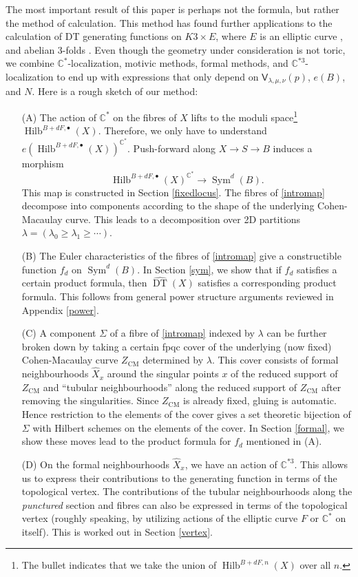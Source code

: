\documentclass{amsart}
\theoremstyle{definition}
\newcommand{\CC} {\mathbb{C}}          %
\newcommand{\sfV}{\mathsf{V}}
\newcommand{\Sym}{\operatorname{Sym}}
\newcommand{\Hilb}{\operatorname{Hilb}}
\newcommand{\DT}{\operatorname{DT}}
\newcommand{\CM}{\operatorname{CM}}
\begin{document}
The most important result of this paper is perhaps not the formula, but rather the method of calculation. This method has found further applications to the calculation of DT generating functions on $K3 \times E$, where $E$ is an elliptic curve \cite{Bry}, and abelian 3-folds \cite{BOPY}. Even though the geometry under consideration is not toric, we combine $\CC^*$-localization, motivic methods, formal methods, and $\CC^{*3}$-localization to end up with expressions that only depend on $\sfV_{\lambda,\mu,\nu}(p)$, $e(B)$, and $N$. Here is a rough sketch of our method:
\begin{enumerate}
\item[(A)] The action of $\CC^*$ on the fibres of $X$ lifts to the moduli space\footnote{The bullet indicates that we take the union of $\Hilb^{B+dF,n}(X)$ over all $n$.} $\Hilb^{B+dF,\bullet}(X)$. Therefore, we only have to understand $e(\Hilb^{B+dF,\bullet}(X))^{\CC^*}$. Push-forward along $X \rightarrow S \rightarrow B$ induces a morphism
\begin{equation} \label{intromap}
\Hilb^{B+dF,\bullet}(X)^{\CC^*} \rightarrow \Sym^d(B).
\end{equation}
This map is constructed in Section \ref{fixedlocus}. The fibres of \eqref{intromap} decompose into components according to the shape of the underlying Cohen-Macaulay curve. This leads to a decomposition over 2D partitions $\lambda = (\lambda_0 \geq \lambda_1 \geq \cdots)$.
\item[(B)] The Euler characteristics of the fibres of \eqref{intromap} give a constructible function $f_d$ on $\Sym^d(B)$. In Section \ref{sym}, we show that if $f_d$ satisfies a certain product formula, then $\widehat{\DT}(X)$ satisfies a corresponding product formula. This follows from general power structure arguments reviewed in Appendix \ref{power}.
\item[(C)] A component $\Sigma$ of a fibre of \eqref{intromap} indexed by $\lambda$ can be further broken down by taking a certain fpqc cover of the underlying (now fixed) Cohen-Macaulay curve $Z_{\CM}$ determined by $\lambda$. This cover consists of formal neighbourhoods $\widehat{X}_x$ around the singular points $x$ of the reduced support of $Z_{\CM}$ and ``tubular neighbourhoods'' along the reduced support of $Z_{\CM}$ after removing the singularities. Since $Z_{\CM}$ is already fixed, gluing is automatic. Hence restriction to the elements of the cover gives a set theoretic bijection of $\Sigma$ with Hilbert schemes on the elements of the cover. In Section \ref{formal}, we show these moves lead to the product formula for $f_d$ mentioned in (A).
\item[(D)] On the formal neighbourhoods $\widehat{X}_x$, we have an action of $\CC^{*3}$. This allows us to express their contributions to the generating function in terms of the topological vertex. The contributions of the tubular neighbourhoods along the \emph{punctured} section and fibres can also be expressed in terms of the topological vertex (roughly speaking, by utilizing actions of the elliptic curve $F$ or $\CC^*$ on itself). This is worked out in Section \ref{vertex}.
\end{enumerate}
\end{document}
